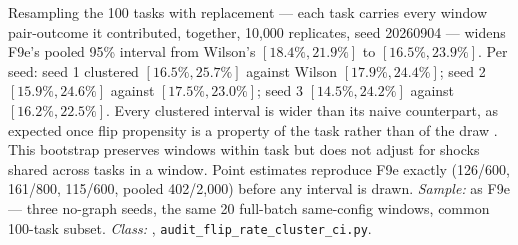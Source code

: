 \begin{description}[leftmargin=0pt,labelindent=0pt,labelsep=0pt,style=nextline,font=\normalfont,itemsep=6pt]
\item[\textbf{F57}\quad Task-clustered bootstrap interval on the same-config
      flip rate.]
Resampling the 100 tasks with replacement --- each task carries every
window pair-outcome it contributed, together, 10{,}000 replicates, seed
20260904 --- widens F9e's pooled 95\% interval from Wilson's $[18.4\%,
21.9\%]$ to $[16.5\%, 23.9\%]$. Per seed: seed 1 clustered $[16.5\%,
25.7\%]$ against Wilson $[17.9\%, 24.4\%]$; seed 2 $[15.9\%, 24.6\%]$
against $[17.5\%, 23.0\%]$; seed 3 $[14.5\%, 24.2\%]$ against $[16.2\%,
22.5\%]$. Every clustered interval is wider than its naive counterpart, as
expected once flip propensity is a property of the task rather than of the
draw . This bootstrap preserves windows within task but does not
adjust for shocks shared across tasks in a window. Point estimates reproduce
F9e exactly (126/600, 161/800, 115/600, pooled 402/2{,}000) before any
interval is drawn. \emph{Sample:}
as F9e --- three no-graph seeds, the same 20 full-batch same-config
windows, common 100-task subset. \emph{Class:} ,
\texttt{audit\_flip\_rate\_cluster\_ci.py}.


\end{description}

